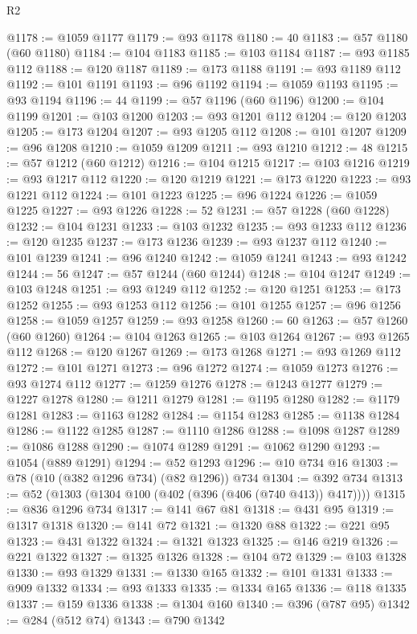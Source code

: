 \begin{lexlean}{R2}
\begin{coremodule}
@1178 := @1059 @1177
@1179 := @93 @1178
@1180 := 40
@1183 := @57 @1180 (@60 @1180)
@1184 := @104 @1183
@1185 := @103 @1184
@1187 := @93 @1185 @112
@1188 := @120 @1187
@1189 := @173 @1188
@1191 := @93 @1189 @112
@1192 := @101 @1191
@1193 := @96 @1192
@1194 := @1059 @1193
@1195 := @93 @1194
@1196 := 44
@1199 := @57 @1196 (@60 @1196)
@1200 := @104 @1199
@1201 := @103 @1200
@1203 := @93 @1201 @112
@1204 := @120 @1203
@1205 := @173 @1204
@1207 := @93 @1205 @112
@1208 := @101 @1207
@1209 := @96 @1208
@1210 := @1059 @1209
@1211 := @93 @1210
@1212 := 48
@1215 := @57 @1212 (@60 @1212)
@1216 := @104 @1215
@1217 := @103 @1216
@1219 := @93 @1217 @112
@1220 := @120 @1219
@1221 := @173 @1220
@1223 := @93 @1221 @112
@1224 := @101 @1223
@1225 := @96 @1224
@1226 := @1059 @1225
@1227 := @93 @1226
@1228 := 52
@1231 := @57 @1228 (@60 @1228)
@1232 := @104 @1231
@1233 := @103 @1232
@1235 := @93 @1233 @112
@1236 := @120 @1235
@1237 := @173 @1236
@1239 := @93 @1237 @112
@1240 := @101 @1239
@1241 := @96 @1240
@1242 := @1059 @1241
@1243 := @93 @1242
@1244 := 56
@1247 := @57 @1244 (@60 @1244)
@1248 := @104 @1247
@1249 := @103 @1248
@1251 := @93 @1249 @112
@1252 := @120 @1251
@1253 := @173 @1252
@1255 := @93 @1253 @112
@1256 := @101 @1255
@1257 := @96 @1256
@1258 := @1059 @1257
@1259 := @93 @1258
@1260 := 60
@1263 := @57 @1260 (@60 @1260)
@1264 := @104 @1263
@1265 := @103 @1264
@1267 := @93 @1265 @112
@1268 := @120 @1267
@1269 := @173 @1268
@1271 := @93 @1269 @112
@1272 := @101 @1271
@1273 := @96 @1272
@1274 := @1059 @1273
@1276 := @93 @1274 @112
@1277 := @1259 @1276
@1278 := @1243 @1277
@1279 := @1227 @1278
@1280 := @1211 @1279
@1281 := @1195 @1280
@1282 := @1179 @1281
@1283 := @1163 @1282
@1284 := @1154 @1283
@1285 := @1138 @1284
@1286 := @1122 @1285
@1287 := @1110 @1286
@1288 := @1098 @1287
@1289 := @1086 @1288
@1290 := @1074 @1289
@1291 := @1062 @1290
@1293 := @1054 (@889 @1291)
@1294 := @52 @1293
@1296 := @10 @734 @16
@1303 := @78 (@10 (@382 @1296 @734) (@82 @1296)) @734
@1304 := @392 @734
@1313 := @52 (@1303 (@1304 @100 (@402 (@396 (@406 (@740 @413)) @417))))
@1315 := @836 @1296 @734
@1317 := @141 @67 @81
@1318 := @431 @95
@1319 := @1317 @1318
@1320 := @141 @72
@1321 := @1320 @88
@1322 := @221 @95
@1323 := @431 @1322
@1324 := @1321 @1323
@1325 := @146 @219
@1326 := @221 @1322
@1327 := @1325 @1326
@1328 := @104 @72
@1329 := @103 @1328
@1330 := @93 @1329
@1331 := @1330 @165
@1332 := @101 @1331
@1333 := @909 @1332
@1334 := @93 @1333
@1335 := @1334 @165
@1336 := @118 @1335
@1337 := @159 @1336
@1338 := @1304 @160
@1340 := @396 (@787 @95)
@1342 := @284 (@512 @74)
@1343 := @790 @1342

\end{coremodule}
\end{lexlean}
